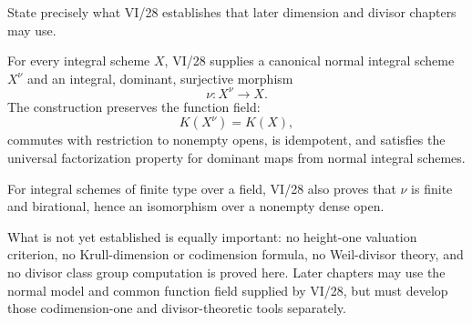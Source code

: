 \begin{problem}\label{prob:vi28-20}
State precisely what VI/28 establishes that later dimension and divisor chapters may use.

\end{problem}

\ifdefined\FullProblemDossiers
\begin{solution}
For every integral scheme \(X\), VI/28 supplies a canonical normal integral scheme \(X^\nu\) and an integral, dominant, surjective morphism
\[
\nu:X^\nu\to X.
\]
The construction preserves the function field:
\[
K(X^\nu)=K(X),
\]
commutes with restriction to nonempty opens, is idempotent, and satisfies the universal factorization property for dominant maps from normal integral schemes.

For integral schemes of finite type over a field, VI/28 also proves that \(\nu\) is finite and birational, hence an isomorphism over a nonempty dense open.

What is not yet established is equally important: no height-one valuation criterion, no Krull-dimension or codimension formula, no Weil-divisor theory, and no divisor class group computation is proved here. Later chapters may use the normal model and common function field supplied by VI/28, but must develop those codimension-one and divisor-theoretic tools separately.
\end{solution}
\fi
